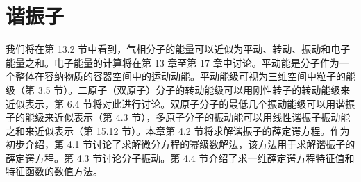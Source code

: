 \chapter{谐振子}
\label{chap:4}
    我们将在第 13.2 节中看到，气相分子的能量可以近似为平动、转动、振动和电子能量之和。电子能量的计算将在第 13 章至第 17 章中讨论。平动能是分子作为一个整体在容纳物质的容器空间中的运动动能。平动能级可视为三维空间中粒子的能级（第 3.5 节）。二原子（双原子）分子的转动能级可以用刚性转子的转动能级来近似表示，第 6.4 节将对此进行讨论。双原子分子的最低几个振动能级可以用谐振子的能级来近似表示（第 4.3 节），多原子分子的振动能可以用线性谐振子振动能之和来近似表示（第 15.12 节）。本章第 4.2 节将求解谐振子的薛定谔方程。作为初步介绍，第 4.1 节讨论了求解微分方程的幂级数解法，该方法用于求解谐振子的薛定谔方程。第 4.3 节讨论分子振动。第 4.4 节介绍了求一维薛定谔方程特征值和特征函数的数值方法。
